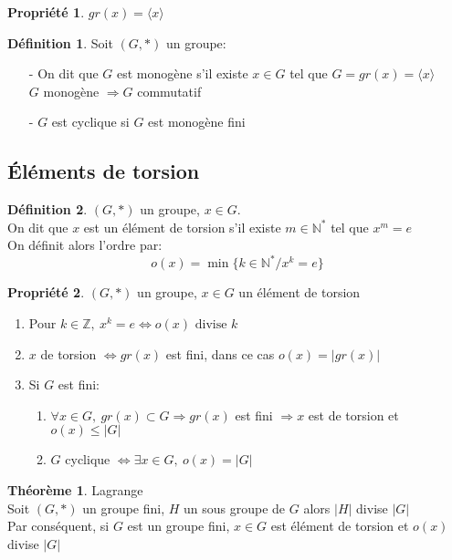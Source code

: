 \documentclass[fleqn]{article}
\theoremstyle{definition} \newtheorem*{defi}{D\'efinition}
\theoremstyle{definition} \newtheorem*{theo}{Th\'eor\`eme}
\theoremstyle{definition} \newtheorem*{coro}{Corollaire}
\theoremstyle{remark} \newtheorem*{rqs}{Remarques}
\theoremstyle{definition} \newtheorem*{prop}{Propri\'et\'e}
\begin{document}
\begin{prop} $gr(x) = \langle x \rangle$ \end{prop}

\begin{defi} Soit $(G, *)$ un groupe:
	\begin{itemize}
		\item [-] On dit que $G$ est monog\`ene s'il existe $x \in G$ tel que $G = gr(x) = \langle x \rangle$ \\
			$G$ monog\`ene $\Rightarrow G$ commutatif
		\item [-] $G$ est cyclique si $G$ est monog\`ene fini
	\end{itemize}
\end{defi}

\subsection{\'El\'ements de torsion}
\begin{defi}
$(G,*)$ un groupe, $x \in G$. \\
On dit que $x$ est un \'el\'ement de torsion s'il existe $m \in \mathbb{N}^{*}$ tel que $x^m = e$ \\
On d\'efinit alors l'ordre par:
	\[o(x) = \min\{k \in \mathbb{N}^* / x^k = e\}\]
\end{defi}

\begin{prop} $(G,*)$ un groupe, $x \in G$ un \'el\'ement de torsion
	\begin{enumerate}
		\item Pour $k \in \mathbb{Z},\ x^k = e \Leftrightarrow o(x) \text{ divise } k$
		\item $x$ de torsion $\Leftrightarrow gr(x)$ est fini, dans ce cas $o(x) = |gr(x)|$
		\item Si $G$ est fini:
			\begin{enumerate}
				\item $\forall x \in G,\ gr(x) \subset G \Rightarrow gr(x)$ est fini $\Rightarrow x$ est de torsion et $o(x) \leq |G|$
				\item $G$ cyclique $\Leftrightarrow \exists x \in G,\ o(x) = |G|$
			\end{enumerate}
	\end{enumerate}
\end{prop}

\begin{theo} Lagrange \\
	Soit $(G, *)$ un groupe fini, $H$ un sous groupe de $G$ alors $|H|$ divise $|G|$ \\
	Par cons\'equent, si $G$ est un groupe fini, $x\in G$ est \'el\'ement de torsion et $o(x)$ divise  $|G|$
\end{theo}
\end{document}
